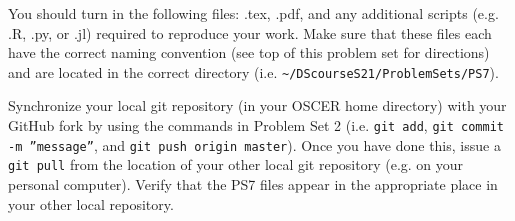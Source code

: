 \documentclass[12pt,english]{exam}
\begin{document}
\begin{questions}
\question You should turn in the following files: .tex, .pdf, and any additional scripts (e.g. .R, .py, or .jl) required to reproduce your work.  Make sure that these files each have the correct naming convention (see top of this problem set for directions) and are located in the correct directory (i.e. \texttt{\textasciitilde/DScourseS21/ProblemSets/PS7}).

\question Synchronize your local git repository (in your OSCER home directory) with your GitHub fork by using the commands in Problem Set 2 (i.e. \texttt{git add}, \texttt{git commit -m ''message''}, and \texttt{git push origin master}). Once you have done this, issue a \texttt{git pull} from the location of your other local git repository (e.g. on your personal computer). Verify that the PS7 files appear in the appropriate place in your other local repository.

\end{questions}
\end{document}
